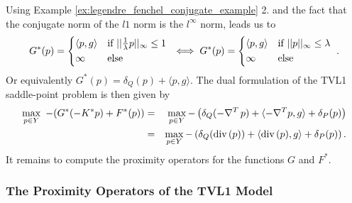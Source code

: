 \documentclass[abstracton]{scrreprt}
\begin{document}
            Using Example \ref{ex:legendre_fenchel_conjugate_example} 2. and the fact that the conjugate norm of the $l1$ norm is the $l^{\infty}$ norm, leads us to
                $$
                    G^{\ast}(p) =
                        \begin{dcases*}
                            \langle p, g \rangle & \textnormal{if $||\frac{1}{\lambda}p||_{\infty} \le 1$} \\
                            \infty & \textnormal{else}
                        \end{dcases*} \iff
                    G^{\ast}(p) =
                        \begin{dcases*}
                            \langle p, g \rangle & \textnormal{if $||p||_{\infty} \le \lambda$} \\
                            \infty & \textnormal{else}
                        \end{dcases*}.
                $$
            Or equivalently $G^{\ast}(p) = \delta_{Q}(p) + \langle p, g \rangle$. The dual formulation of the TVL1 saddle-point problem is then given by
                \begin{eqnarray}
                    \max_{p \in Y}\,\, -(G^{\ast}(-K^{\ast}p) + F^{\ast}(p)) &=& \max_{p \in Y} -\left( \delta_{Q}(-\nabla^{T}\,p) + \langle -\nabla^{T}p, g \rangle + \delta_{P}(p) \right) \notag \\
                    &=& \max_{p \in Y} -\left( \delta_{Q}(\textnormal{div}\,(p)) + \langle \textnormal{div}\,(p), g \rangle + \delta_{P}(p) \right). \notag
                \end{eqnarray}
            It remains to compute the proximity operators for the functions $G$ and $F^{\ast}$.
        

        \subsubsection{The Proximity Operators of the TVL1 Model} %
        \label{ssub:the_proximity_operators_of_the_tvl1_model}
            
\end{document}
